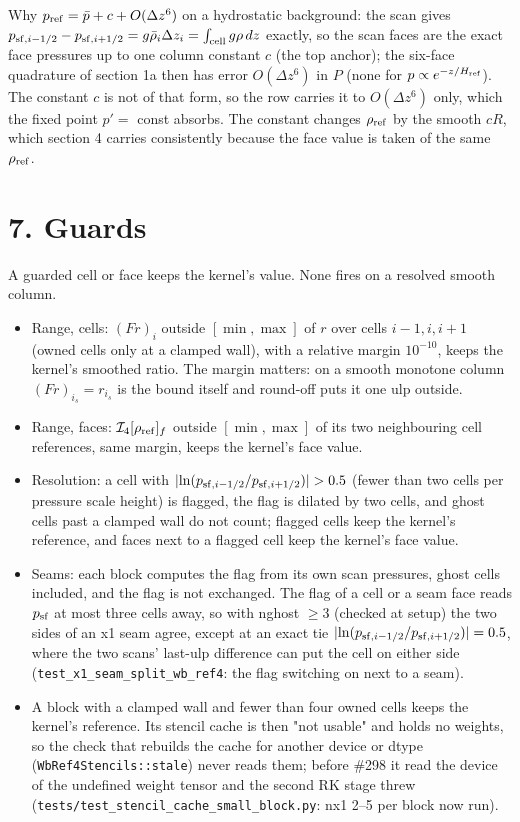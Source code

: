 \documentclass[11pt,a4paper]{article}
\begin{document}
Why $p_{\rm ref} = \bar p + c + O(\Delta z^6)$ on a hydrostatic background: the scan gives
$p_{{\rm sf},i-1/2} - p_{{\rm sf},i+1/2} = g\bar\rho_i\Delta z_i = \int_{\rm cell} g\rho\,dz$ exactly, so the scan
faces are the exact face pressures up to one column constant $c$ (the top anchor); the six-face quadrature
of section 1a then has error $O(\Delta z^6)$ in $P$ (none for $p \propto e^{-z/H_{\rm ref}}$). The constant $c$ is not of
that form, so the row carries it to $O(\Delta z^6)$ only, which the fixed point $p' = $ const absorbs. The constant changes $\rho_{\rm ref}$ by the smooth $cR$, which section 4
carries consistently because the face value is taken of the same $\rho_{\rm ref}$.

\section*{7. Guards}

A guarded cell or face keeps the kernel's value. None fires on a resolved smooth column.

\begin{itemize}
\item Range, cells: $(Fr)_i$ outside $[\min, \max]$ of $r$ over cells $i-1, i, i+1$ (owned cells only at a clamped
  wall), with a relative margin $10^{-10}$, keeps the kernel's smoothed ratio. The margin matters: on a smooth
  monotone column $(Fr)_{i_s} = r_{i_s}$ is the bound itself and round-off puts it one ulp outside.
\item Range, faces: $\mathcal I_4[\rho_{\rm ref}]_f$ outside $[\min, \max]$ of its two neighbouring cell references,
  same margin, keeps the kernel's face value.
\item Resolution: a cell with $\lvert\ln(p_{{\rm sf},i-1/2}/p_{{\rm sf},i+1/2})\rvert > 0.5$ (fewer than two cells per
  pressure scale height) is flagged, the flag is dilated by two cells, and ghost cells past a clamped wall do
  not count; flagged cells keep the kernel's reference, and faces next to a flagged cell keep the kernel's
  face value.
\item Seams: each block computes the flag from its own scan pressures, ghost cells included, and the flag is not
  exchanged. The flag of a cell or a seam face reads $p_{\rm sf}$ at most three cells away, so with nghost
  $\ge 3$ (checked at setup) the two sides of an x1 seam agree, except at an exact tie
  $\lvert\ln(p_{{\rm sf},i-1/2}/p_{{\rm sf},i+1/2})\rvert = 0.5$, where the two scans' last-ulp difference can
  put the cell on either side (\texttt{test\_x1\_seam\_split\_wb\_ref4}: the flag switching on next to a seam).
\item A block with a clamped wall and fewer than four owned cells keeps the kernel's reference. Its stencil cache
  is then "not usable" and holds no weights, so the check that rebuilds the cache for another device or dtype
  (\texttt{WbRef4Stencils::stale}) never reads them; before \#298 it read the device of the undefined weight tensor and
  the second RK stage threw (\texttt{tests/test\_stencil\_cache\_small\_block.py}: nx1 2–5 per block now run).
\end{itemize}
\end{document}
